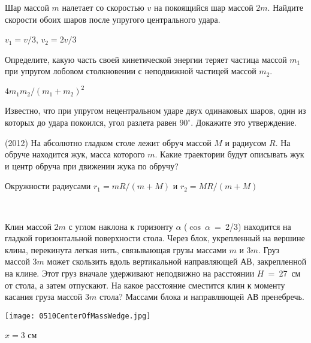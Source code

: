 \begin{ex}
Шар массой $m$ налетает со скоростью $v$ на покоящийся шар массой $2m$. Найдите скорости обоих шаров после упругого центрального удара. 
\begin{ans}
$v_1 = v/3$, $v_2 = 2v/3$
\end{ans}
\end{ex}

\begin{ex}
Определите, какую часть своей кинетической энергии теряет частица массой $m_1$ при упругом лобовом столкновении 
с неподвижной частицей массой $m_2$. 
\begin{ans}
$4m_1m_2/(m_1+m_2)^2$
\end{ans}
\end{ex}

\begin{ex}
Известно, что при упругом нецентральном ударе двух одинаковых шаров, один из которых до удара покоился, угол разлета равен $90^{\circ}$. Докажите это утверждение.
\end{ex}

\begin{ex}
(2012) На абсолютно гладком столе лежит обруч массой $M$ и радиусом $R$. На обруче находится жук, масса которого $m$. Какие траектории будут описывать жук и центр обруча при движении жука по обручу?
\begin{ans}
Окружности радиусами $r_1 = mR/(m+M)$ и $r_2 = MR/(m+M)$
\end{ans}
\end{ex}

\begin{ex}
\hspace{0pt} \\
\begin{minipage}{.65\textwidth}
Клин массой $2m$ с углом наклона к горизонту $\alpha $ ($\cos~\alpha$~=~2/3) находится на гладкой горизонтальной поверхности стола. Через блок, укрепленный на вершине клина, перекинута легкая нить, связывающая грузы массами $m$ и $3m$. Груз массой $3m$ может скользить вдоль вертикальной направляющей АВ, закрепленной на клине. Этот груз вначале удерживают неподвижно на расстоянии $H$~=~27~см от стола, а затем отпускают. На какое расстояние сместится клин к моменту касания груза массой $3m$ стола? Массами блока и направляющей АВ пренебречь.
\end{minipage}
\begin{minipage}{.35\textwidth}
\centering
\texttt{[image: 0510CenterOfMassWedge.jpg]}
\end{minipage}
\begin{ans}
$x = 3$ см
\end{ans}
\end{ex}


